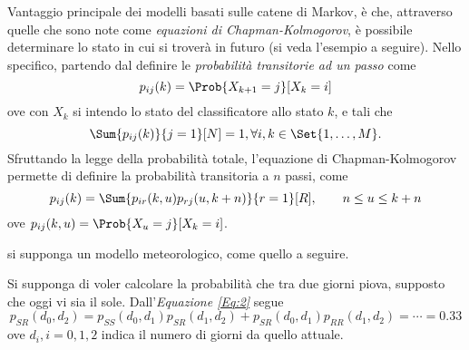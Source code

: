 \documentclass{subfiles}
\begin{document}
Vantaggio principale dei modelli basati sulle catene di Markov, è che, attraverso quelle che sono note come \emph{equazioni di Chapman-Kolmogorov},
è possibile determinare lo stato in cui si troverà in futuro (si veda l'esempio a seguire).
Nello specifico, partendo dal definire le \emph{probabilità transitorie ad un passo} come
\[
    p_{ij}(k) = \Prob{X_{k + 1} = j}[X_{k} = i]
\]
ove con \(X_{k}\) si intendo lo stato del classificatore allo stato \(k\), e tali che
\[
    \Sum{p_{ij}(k)}{j = 1}[N] = 1, \forall i, k \in \Set{1, \ldots, M}.
\]
Sfruttando la legge della probabilità totale, l'equazione di Chapman-Kolmogorov permette di definire la probabilità transitoria a \(n\) passi,
come
\begin{equation}
    p_{ij}(k) = \Sum{p_{ir}(k, u) p_{rj}(u, k + n)}{r = 1}[R], \qquad n \le u \le k + n
\end{equation}
ove \(p_{ij}(k, u) = \Prob{X_{u} = j}[X_{k} = i]\).
\clearpage
\begin{Example*}
    si supponga un modello meteorologico, come quello a seguire.
    

    \noindent Si supponga di voler calcolare la probabilità che tra due giorni piova, supposto che oggi vi sia il sole.
    Dall'\emph{Equazione \eqref{Eq:2}} segue
    \[
        p_{SR}(d_{0}, d_{2}) = p_{SS}(d_{0}, d_{1}) p_{SR}(d_{1}, d_{2}) + p_{SR}(d_{0}, d_{1}) p_{RR}(d_{1}, d_{2}) = \cdots = 0.33
    \]
    ove \(d_{i}, i = 0, 1, 2\) indica il numero di giorni da quello attuale.
\end{Example*}
\end{document}

